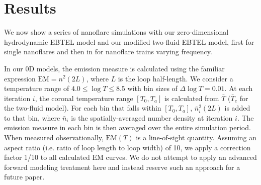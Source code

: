 \documentclass[apj]{emulateapj}
\begin{document}
	\section{Results}
	\label{sec:results}
	\par We now show a series of nanoflare simulations with our zero-dimensional hydrodynamic EBTEL model \citep{klimchuk_highly_2008, cargill_enthalpy-based_2012, cargill_enthalpy-based_2012-1, cargill_modelling_2015} and our modified two-fluid EBTEL model, first for single nanoflares and then in  for nanoflare trains varying frequency.
	\par In our 0D models, the emission measure is calculated using the familiar expression $\mathrm{EM}=n^2(2L)$, where $L$ is the loop half-length. We consider a temperature range of $4.0\le\log{T}\le8.5$ with bin sizes of $\Delta\log{T}=0.01$. At each iteration $i$, the coronal temperature range $[T_0,T_a]$ is calculated from $\bar{T}$ ($\bar{T}_e$ for the two-fluid model). For each bin that falls within $[T_0,T_a]$, $\bar{n}_i^2(2L)$ is added to that bin, where $\bar{n}_i$ is the spatially-averaged number density at iteration $i$. The emission measure in each bin is then averaged over the entire simulation period. When measured observationally, $\mathrm{EM}(T)$ is a line-of-sight quantity. Assuming an aspect ratio (i.e. ratio of loop length to loop width) of 10, we apply a correction factor 1/10 to all calculated $\mathrm{EM}$ curves. We do not attempt to apply an advanced forward modeling treatment here and instead reserve such an approach for a future paper.
\end{document}
